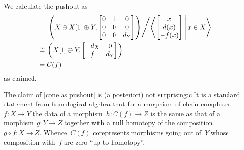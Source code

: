 \documentclass[a4paper,10pt]{scrartcl}
\begin{document}
We calculate the pushout as
\begin{align*}
  {}&
  \left.
  \left(
    X \oplus X[1] \oplus Y,
    \begin{bmatrix}
      0 & 1 & 0   \\
      0 & 0 & 0   \\
      0 & 0 & d_Y
    \end{bmatrix}
  \right)
  \middle/
  \gen*{
    \begin{bmatrix}
          x  \\
        d(x) \\
      -f(x)
    \end{bmatrix}
  \suchthat*
    x \in X
  }
  \right.
  \\
  \iso{}&
  \left(
    X[1] \oplus Y,
    \begin{bmatrix}
      -d_X & 0   \\
        f   & d_Y
    \end{bmatrix}
  \right)
  \\
  ={}&
  C(f)
\end{align*}
as claimed.

\begin{remark}
  The claim of \cref{cone as pushout} is (a posteriori) not  surprising:c
  It is a standard statement from homological algebra that for a morphism of chain complexes~$f \colon X \to Y$ the data of a morphism~$h \colon C(f) \to Z$ is the same as that of a morphism~$g \colon Y \to Z$ together with a null homotopy of the composition~$g \circ f \colon X \to Z$.
  Whence~$C(f)$ corepresents morphisms going out of~$Y$ whose composition with~$f$ are zero \enquote{up to homotopy}.
\end{remark}
\end{document}
